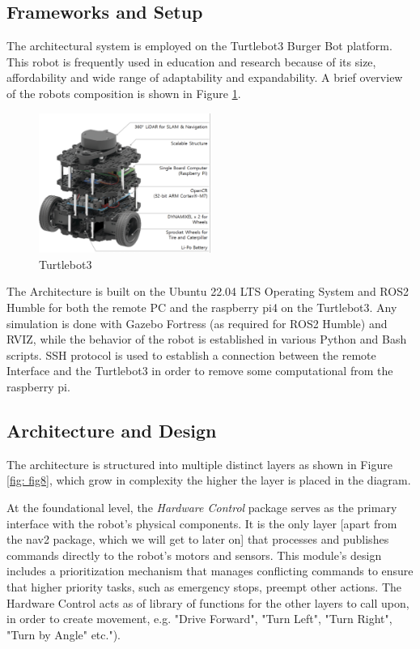 \documentclass[]{article}
\begin{document}
	\subsection{Frameworks and Setup}

	The architectural system is employed on the Turtlebot3 Burger Bot platform. This robot is frequently used in education and research because of its size, affordability and wide range of adaptability and expandability. A brief overview of the robots composition is shown in Figure \ref{fig: fig7}. 
		
	\begin{figure}[ht]
		\centering
		\includegraphics[width=0.5\textwidth]{Graphics/Turtlebot3}
		\caption{Turtlebot3}
		\label{fig: fig7}
	\end{figure}
		
	 The Architecture is built on the Ubuntu 22.04 LTS Operating System and ROS2 Humble for both the remote PC and the raspberry pi4 on the Turtlebot3. Any simulation is done with Gazebo Fortress (as required for ROS2 Humble) and RVIZ, while the behavior of the robot is established in various Python and Bash scripts. SSH protocol is used to establish a connection between the remote Interface and the Turtlebot3 in order to remove some computational from the raspberry pi. 
	 
	 
	\subsection{Architecture and Design}
	
	The architecture is structured into multiple distinct layers as shown in Figure \ref{fig: fig8}, which grow in complexity the higher the layer is placed in the diagram.
	
	At the foundational level, the \textit{Hardware Control} package serves as the primary interface with the robot's physical components. It is the only layer [apart from the nav2 package, which we will get to later on] that processes and publishes commands directly to the robot's motors and sensors. This module's design includes a prioritization mechanism that manages conflicting commands to ensure that higher priority tasks, such as emergency stops, preempt other actions. The Hardware Control acts as of library of functions for the other layers to call upon, in order to create movement, e.g. "Drive Forward", "Turn Left", "Turn Right", "Turn by Angle" etc.").
	
\end{document}
